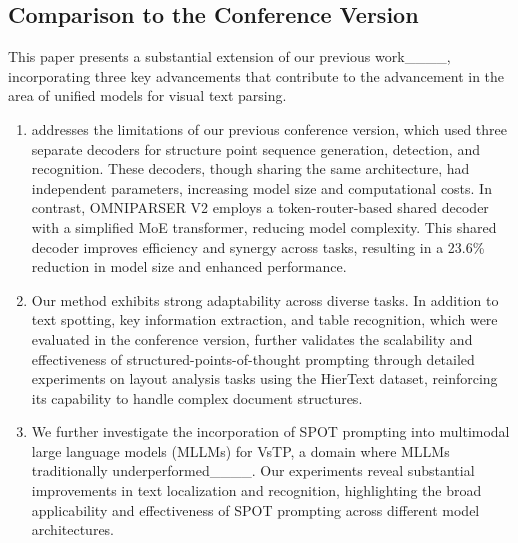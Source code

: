 \subsection{Comparison to the Conference Version}
This paper presents a substantial extension of our previous work____, incorporating three key advancements that contribute to the advancement in the area of unified models for visual text parsing.

\begin{enumerate}

\item \ourmodel addresses the limitations of our previous conference version, which used three separate decoders for structure point sequence generation, detection, and recognition. These decoders, though sharing the same architecture, had independent parameters, increasing model size and computational costs. In contrast, OMNIPARSER V2 employs a token-router-based shared decoder with a simplified MoE transformer, reducing model complexity. This shared decoder improves efficiency and synergy across tasks, resulting in a 23.6\% reduction in model size and enhanced performance.

\item Our method exhibits strong adaptability across diverse tasks. In addition to text spotting, key information extraction, and table recognition, which were evaluated in the conference version, \ourmodel further validates the scalability and effectiveness of structured-points-of-thought prompting through detailed experiments on layout analysis tasks using the HierText dataset, reinforcing its capability to handle complex document structures.

\item We further investigate the incorporation of SPOT prompting into multimodal large language models (MLLMs) for VsTP, a domain where MLLMs traditionally underperformed____. Our experiments reveal substantial improvements in text localization and recognition, highlighting the broad applicability and effectiveness of SPOT prompting across different model architectures.

\end{enumerate}